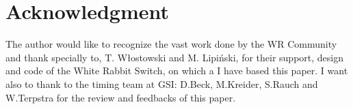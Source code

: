 \section{Acknowledgment}

The author would like to recognize the vast work done by the WR Community 
and thank specially to, T. W\l{}ostowski and M. Lipiński, for their support,  
design and code of the White Rabbit Switch, on which a I have based this paper.
I want also to thank to the timing team at GSI: D.Beck, M.Kreider, S.Rauch  and
W.Terpstra for the review and feedbacks of this paper.
